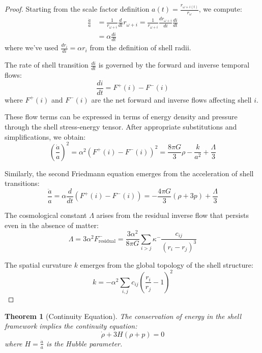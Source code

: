 \documentclass[12pt,a4paper]{article}
\newtheorem{theorem}{Theorem}[section]
\begin{document}
\begin{proof}
Starting from the scale factor definition $a(t) = \frac{r_{\omega+i(t)}}{r_{\omega}}$, we compute:
\begin{align}
\frac{\dot{a}}{a} &= \frac{1}{r_{\omega+i}} \frac{d}{dt}r_{\omega+i} = \frac{1}{r_{\omega+i}} \frac{dr_{\omega+i}}{di} \frac{di}{dt} \\
&= \alpha \frac{di}{dt}
\end{align}
where we've used $\frac{dr_i}{di} = \alpha r_i$ from the definition of shell radii.

The rate of shell transition $\frac{di}{dt}$ is governed by the forward and inverse temporal flows:
\begin{equation}
\frac{di}{dt} = F^+(i) - F^-(i)
\end{equation}
where $F^+(i)$ and $F^-(i)$ are the net forward and inverse flows affecting shell $i$.

These flow terms can be expressed in terms of energy density and pressure through the shell stress-energy tensor. After appropriate substitutions and simplifications, we obtain:
\begin{equation}
\left(\frac{\dot{a}}{a}\right)^2 = \alpha^2 (F^+(i) - F^-(i))^2 = \frac{8\pi G}{3}\rho - \frac{k}{a^2} + \frac{\Lambda}{3}
\end{equation}

Similarly, the second Friedmann equation emerges from the acceleration of shell transitions:
\begin{equation}
\frac{\ddot{a}}{a} = \alpha \frac{d}{dt}(F^+(i) - F^-(i)) = -\frac{4\pi G}{3}(\rho + 3p) + \frac{\Lambda}{3}
\end{equation}

The cosmological constant $\Lambda$ arises from the residual inverse flow that persists even in the absence of matter:
\begin{equation}
\Lambda = 3\alpha^2 F^-_{\text{residual}} = \frac{3\alpha^2}{8\pi G} \sum_{i>j} \kappa^- \frac{c_{ij}}{(r_i - r_j)^3}
\end{equation}

The spatial curvature $k$ emerges from the global topology of the shell structure:
\begin{equation}
k = -\alpha^2 \sum_{i,j} c_{ij}\left(\frac{r_i}{r_j} - 1\right)^2
\end{equation}
\end{proof}

\begin{theorem}[Continuity Equation]
\label{thm:continuity-equation}
The conservation of energy in the shell framework implies the continuity equation:
\begin{equation}
\dot{\rho} + 3H(\rho + p) = 0
\end{equation}
where $H = \frac{\dot{a}}{a}$ is the Hubble parameter.
\end{theorem}
\end{document}
